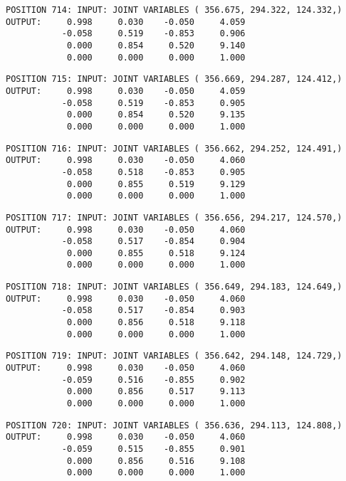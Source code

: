 \begin{verbatim}
POSITION 714: INPUT: JOINT VARIABLES ( 356.675, 294.322, 124.332,)
OUTPUT:     0.998     0.030    -0.050     4.059
           -0.058     0.519    -0.853     0.906
            0.000     0.854     0.520     9.140
            0.000     0.000     0.000     1.000
\end{verbatim} \pagebreak[1]\begin{verbatim}
POSITION 715: INPUT: JOINT VARIABLES ( 356.669, 294.287, 124.412,)
OUTPUT:     0.998     0.030    -0.050     4.059
           -0.058     0.519    -0.853     0.905
            0.000     0.854     0.520     9.135
            0.000     0.000     0.000     1.000
\end{verbatim} \pagebreak[1]\begin{verbatim}
POSITION 716: INPUT: JOINT VARIABLES ( 356.662, 294.252, 124.491,)
OUTPUT:     0.998     0.030    -0.050     4.060
           -0.058     0.518    -0.853     0.905
            0.000     0.855     0.519     9.129
            0.000     0.000     0.000     1.000
\end{verbatim} \pagebreak[1]\begin{verbatim}
POSITION 717: INPUT: JOINT VARIABLES ( 356.656, 294.217, 124.570,)
OUTPUT:     0.998     0.030    -0.050     4.060
           -0.058     0.517    -0.854     0.904
            0.000     0.855     0.518     9.124
            0.000     0.000     0.000     1.000
\end{verbatim} \pagebreak[1]\begin{verbatim}
POSITION 718: INPUT: JOINT VARIABLES ( 356.649, 294.183, 124.649,)
OUTPUT:     0.998     0.030    -0.050     4.060
           -0.058     0.517    -0.854     0.903
            0.000     0.856     0.518     9.118
            0.000     0.000     0.000     1.000
\end{verbatim} \pagebreak[1]\begin{verbatim}
POSITION 719: INPUT: JOINT VARIABLES ( 356.642, 294.148, 124.729,)
OUTPUT:     0.998     0.030    -0.050     4.060
           -0.059     0.516    -0.855     0.902
            0.000     0.856     0.517     9.113
            0.000     0.000     0.000     1.000
\end{verbatim} \pagebreak[1]\begin{verbatim}
POSITION 720: INPUT: JOINT VARIABLES ( 356.636, 294.113, 124.808,)
OUTPUT:     0.998     0.030    -0.050     4.060
           -0.059     0.515    -0.855     0.901
            0.000     0.856     0.516     9.108
            0.000     0.000     0.000     1.000
\end{verbatim} \pagebreak[1]\begin{verbatim}

\end{verbatim}
